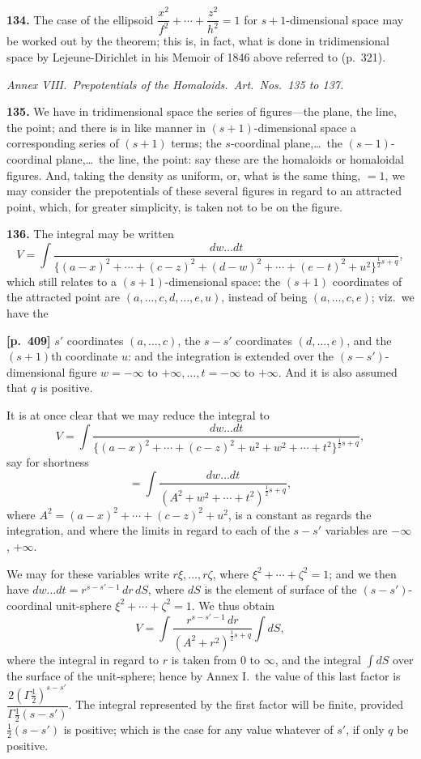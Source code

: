 \documentclass[11pt,a4paper]{article}
\begin{document}
\textbf{134.} The case of the ellipsoid $\dfrac{x^{2}}{f^{2}} + \cdots + \dfrac{z^{2}}{h^{2}} = 1$ for $s+1$-dimensional space may be worked out by the theorem; this is, in fact, what is done in tridimensional space by Lejeune-Dirichlet in his Memoir of 1846 above referred to (p.~321).

\bigskip
\begin{center}
\textit{Annex VIII.\ Prepotentials of the Homaloids.\ Art.\ Nos.\ 135 to 137.}
\end{center}

\textbf{135.} We have in tridimensional space the series of figures---the plane, the line, the point; and there is in like manner in $(s+1)$-dimensional space a corresponding series of $(s+1)$ terms; the $s$-coordinal plane,\ldots\ the $(s-1)$-coordinal plane,\ldots\ the line, the point: say these are the homaloids or homaloidal figures. And, taking the density as uniform, or, what is the same thing, $=1$, we may consider the prepotentials of these several figures in regard to an attracted point, which, for greater simplicity, is taken not to be on the figure.

\textbf{136.} The integral may be written
\[
V = \int \frac{dw\ldots dt}{\{(a-x)^{2}+\cdots+(c-z)^{2}+(d-w)^{2}+\cdots+(e-t)^{2}+u^{2}\}^{\tfrac{1}{2}s+q}},
\]
which still relates to a $(s+1)$-dimensional space: the $(s+1)$ coordinates of the attracted point are $(a,\ldots,c,d,\ldots,e,u)$, instead of being $(a,\ldots,c,e)$; viz.\ we have the

\bigskip
\noindent\textbf{[p.~409]}\quad
$s'$ coordinates $(a,\ldots,c)$, the $s-s'$ coordinates $(d,\ldots,e)$, and the $(s+1)$th coordinate $u$: and the integration is extended over the $(s-s')$-dimensional figure $w = -\infty$ to $+\infty,\ldots,t = -\infty$ to $+\infty$. And it is also assumed that $q$ is positive.

It is at once clear that we may reduce the integral to
\[
V = \int \frac{dw\ldots dt}{\{(a-x)^{2}+\cdots+(c-z)^{2}+u^{2}+w^{2}+\cdots+t^{2}\}^{\tfrac{1}{2}s+q}},
\]
say for shortness
\[
= \int \frac{dw\ldots dt}{(A^{2}+w^{2}+\cdots+t^{2})^{\tfrac{1}{2}s+q}},
\]
where $A^{2} = (a-x)^{2}+\cdots+(c-z)^{2}+u^{2}$, is a constant as regards the integration, and where the limits in regard to each of the $s-s'$ variables are $-\infty$, $+\infty$.

We may for these variables write $r\xi,\ldots,r\zeta$, where $\xi^{2}+\cdots+\zeta^{2} = 1$; and we then have $dw\ldots dt = r^{s-s'-1}\,dr\,dS$, where $dS$ is the element of surface of the $(s-s')$-coordinal unit-sphere $\xi^{2}+\cdots+\zeta^{2}=1$. We thus obtain
\[
V = \int \frac{r^{s-s'-1}\,dr}{(A^{2}+r^{2})^{\tfrac{1}{2}s+q}}\int dS,
\]
where the integral in regard to $r$ is taken from $0$ to $\infty$, and the integral $\int dS$ over the surface of the unit-sphere; hence by Annex I.\ the value of this last factor is $\dfrac{2(\Gamma\tfrac{1}{2})^{s-s'}}{\Gamma\tfrac{1}{2}(s-s')}$. The integral represented by the first factor will be finite, provided $\tfrac{1}{2}(s-s')$ is positive; which is the case for any value whatever of $s'$, if only $q$ be positive.
\end{document}
